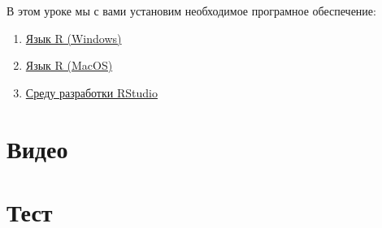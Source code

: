\documentclass[
]{book}
\providecommand{\tightlist}{%
  \setlength{\itemsep}{0pt}\setlength{\parskip}{0pt}}
\begin{document}
В этом уроке мы с вами установим необходимое програмное обеспечение:

\begin{enumerate}
\def\labelenumi{\arabic{enumi}.}
\tightlist
\item
  \href{https://cran.r-project.org/bin/windows/base/}{Язык R (Windows)}
\item
  \href{https://cran.r-project.org/bin/macosx/}{Язык R (MacOS)}
\item
  \href{https://www.rstudio.com/products/rstudio/download/}{Среду разработки RStudio}
\end{enumerate}

\hypertarget{ux432ux438ux434ux435ux43e}{%
\section{Видео}\label{ux432ux438ux434ux435ux43e}}

\hypertarget{ux442ux435ux441ux442}{%
\section{Тест}\label{ux442ux435ux441ux442}}
\end{document}
